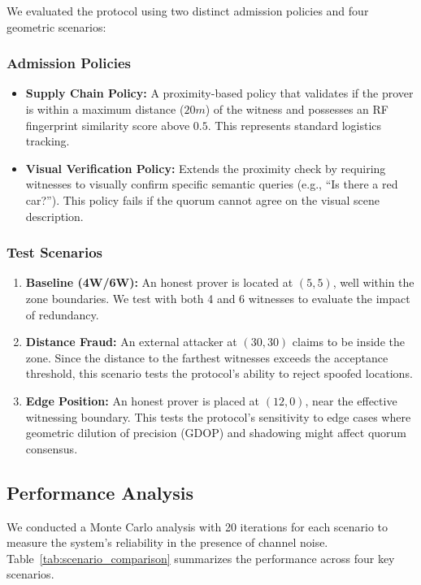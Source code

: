 We evaluated the protocol using two distinct admission policies and four geometric scenarios:

\subsubsection{Admission Policies}
\begin{itemize}
    \item \textbf{Supply Chain Policy:} A proximity-based policy that validates if the prover is within a maximum distance ($20m$) of the witness and possesses an RF fingerprint similarity score above $0.5$. This represents standard logistics tracking.
    \item \textbf{Visual Verification Policy:} Extends the proximity check by requiring witnesses to visually confirm specific semantic queries (e.g., ``Is there a red car?''). This policy fails if the quorum cannot agree on the visual scene description.
\end{itemize}

\subsubsection{Test Scenarios}
\begin{enumerate}
    \item \textbf{Baseline (4W/6W):} An honest prover is located at $(5, 5)$, well within the zone boundaries. We test with both 4 and 6 witnesses to evaluate the impact of redundancy.
    \item \textbf{Distance Fraud:} An external attacker at $(30, 30)$ claims to be inside the zone. Since the distance to the farthest witnesses exceeds the acceptance threshold, this scenario tests the protocol's ability to reject spoofed locations.
    \item \textbf{Edge Position:} An honest prover is placed at $(12, 0)$, near the effective witnessing boundary. This tests the protocol's sensitivity to edge cases where geometric dilution of precision (GDOP) and shadowing might affect quorum consensus.
\end{enumerate}

\subsection{Performance Analysis}

We conducted a Monte Carlo analysis with 20 iterations for each scenario to measure the system's reliability in the presence of channel noise. Table~\ref{tab:scenario_comparison} summarizes the performance across four key scenarios.


